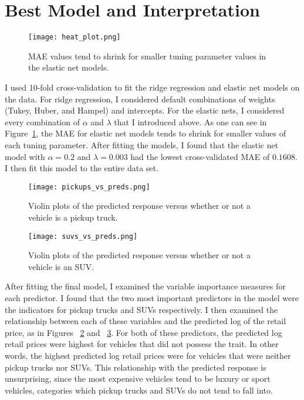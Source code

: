 \documentclass{article}
\begin{document}
\section{Best Model and Interpretation}

\begin{figure}
    \centering
    \texttt{[image: heat\_plot.png]}
    \caption{MAE values tend to shrink for smaller tuning parameter values in the elastic net models.}
    \label{fig:heat_plot}
\end{figure}

I used 10-fold cross-validation to fit the ridge regression and elastic net models on the data.  For 
ridge regression, I considered default combinations of weights (Tukey, Huber, and Hampel) and intercepts.  
For the elastic nets, I considered every combination of $\alpha$ and $\lambda$ that I introduced above.  
As one can see in Figure~\ref{fig:heat_plot}, the MAE for elastic net models tends to shrink for smaller 
values of each tuning parameter. 
 After fitting the models, I found that the elastic net model with $\alpha = 0.2$ and $\lambda = 0.003$ 
 had the lowest cross-validated MAE of $0.1608$.  I then fit this model to the entire data set.

\begin{figure}
    \centering
    \texttt{[image: pickups\_vs\_preds.png]}
    \caption{Violin plots of the predicted response versus whether or not a vehicle is a pickup truck.}
    \label{fig:pickup_violin}
\end{figure}
\begin{figure}
    \centering
    \texttt{[image: suvs\_vs\_preds.png]}
    \caption{Violin plots of the predicted response versus whether or not a vehicle is an SUV.}
    \label{fig:suv_violin}
\end{figure}

After fitting the final model, I examined the variable importance measures for each predictor.  I found 
that the two most important predictors in the model were the indicators for pickup trucks and SUVs 
respectively.  I then examined the relationship between each of these variables and the predicted log 
of the retail price, as in Figures ~\ref{fig:pickup_violin} and ~\ref{fig:suv_violin}.  For both of 
these predictors, the predicted log retail prices were highest for vehicles that did not possess the 
trait.  In other words, the highest predicted log retail prices were for vehicles that were neither 
pickup trucks nor SUVs.  This relationship with the predicted response is unsurprising, since the most 
expensive vehicles tend to be luxury or sport vehicles, categories which pickup trucks and SUVs do not 
tend to fall into.  
\end{document}
